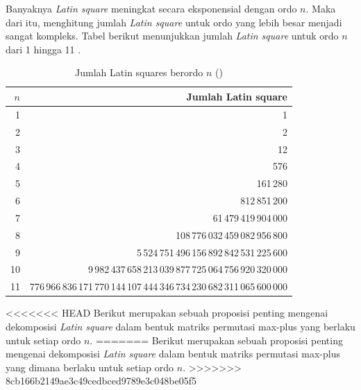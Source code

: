 Banyaknya \textit{Latin square} meningkat secara eksponensial dengan ordo $n$. Maka dari itu, menghitung jumlah \textit{Latin square} untuk ordo yang lebih besar menjadi sangat kompleks.
Tabel berikut menunjukkan jumlah \textit{Latin square} untuk ordo $n$ dari 1 hingga 11 \parencite{oeisA002860}.

\begin{table}[h]
  \centering
  \caption{Jumlah Latin squares berordo $n$ (\cite{oeisA002860})}
  \begin{tabular}{r r}
    \hline
    $n$ & Jumlah Latin square                                                            \\
    \hline
    1   & 1                                                                              \\
    2   & 2                                                                              \\
    3   & 12                                                                             \\
    4   & 576                                                                            \\
    5   & 161\,280                                                                       \\
    6   & 812\,851\,200                                                                  \\
    7   & 61\,479\,419\,904\,000                                                         \\
    8   & 108\,776\,032\,459\,082\,956\,800                                              \\
    9   & 5\,524\,751\,496\,156\,892\,842\,531\,225\,600                                 \\
    10  & 9\,982\,437\,658\,213\,039\,877\,725\,064\,756\,920\,320\,000                  \\
    11  & 776\,966\,836\,171\,770\,144\,107\,444\,346\,734\,230\,682\,311\,065\,600\,000 \\
    \hline
  \end{tabular}
\end{table}

<<<<<<< HEAD
Berikut merupakan sebuah proposisi penting mengenai dekomposisi \textit{Latin square} dalam bentuk matriks permutasi max-plus yang berlaku untuk setiap ordo $n$.
=======
Berikut merupakan sebuah proposisi penting mengenai dekomposisi \textit{Latin square} dalam bentuk matriks permutasi max-plus yang dimana berlaku untuk setiap ordo $n$.
>>>>>>> 8cb166b2149ae3c49cedbced9789e3c048be05f5

